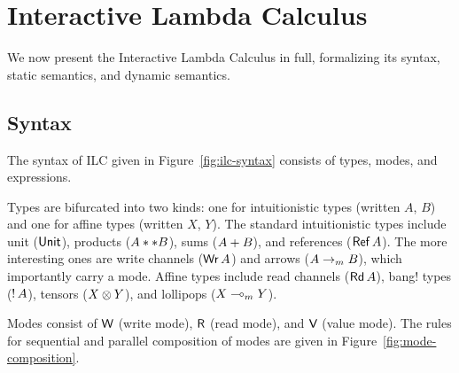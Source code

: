 




\section{Interactive Lambda Calculus}
\label{sec:ilc}

We now present the Interactive Lambda Calculus in full, formalizing its syntax,
static semantics, and dynamic semantics.

\subsection{Syntax}
\label{subsec:syntax}

The syntax of ILC given in Figure~\ref{fig:ilc-syntax} consists of types, modes,
and expressions.

Types are bifurcated into two kinds: one for intuitionistic types (written $A$,
$B$) and one for affine types (written $X$, $Y$). The standard intuitionistic
types include unit ($\text{\textsf{Unit}}$), products (${A} ** {B}$), sums
(${A} + {B}$), and references ($\text{\textsf{Ref}}\,A$). The more interesting ones are
write channels ($\text{\textsf{Wr}}\,A$) and arrows (${A}\rightarrow_{\footnotesize m}{B}$), which
importantly carry a mode. Affine types include read channels ($\text{\textsf{Rd}}\,A$),
bang! types (${!}\,{A}$), tensors (${X}\otimes{Y}$), and lollipops
(${X}\multimap_{\footnotesize m}{Y}$).

Modes consist of $\textsf{W}$ (write mode), $\textsf{R}$ (read mode), and $\textsf{V}$ (value
mode). The rules for sequential and parallel composition of modes are given in
Figure~\ref{fig:mode-composition}.



